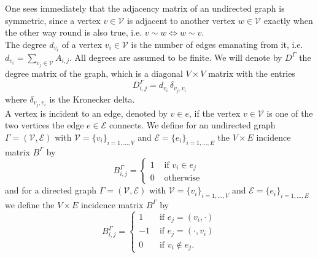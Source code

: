 One sees immediately that the adjacency matrix of an undirected graph is symmetric, since a vertex $v \in \mathcal{V}$ is adjacent to another vertex $w \in \mathcal{V}$ exactly when the other way round is also true, i.e. $v \sim w \Leftrightarrow w \sim v$. \\
The degree $d_{v_i}$ of a vertex $v_i \in \mathcal{V}$ is the number of edges emanating from it, i.e. $d_{v_i} = \sum_{v_j \in \mathcal{V}} A_{i, j}$. All degrees are assumed to be finite. We will denote by $D^{\Gamma}$ the degree matrix of the graph, which is a diagonal $V \times V$ matrix with the entries
\begin{equation}
    \label{degree matrix}
    D^{\Gamma}_{i, j} = d_{v_i} \, \delta_{v_j, v_i}
\end{equation}
where $\delta_{v_j, v_i}$ is the Kronecker delta. \\
A vertex is incident to an edge, denoted by $v \in e$, if the vertex $v \in \mathcal{V}$ is one of the two vertices the edge $e \in \mathcal{E}$ connects. We define for an undirected graph $\Gamma = (\mathcal{V}, \mathcal{E})$ with $\mathcal{V} = \{v_i\}_{i = 1, \ldots, V}$ and $\mathcal{E} = \{e_i\}_{i = 1, \ldots, E}$ the $V \times E$ incidence matrix $B^{\Gamma}$ by  
\begin{equation}
    \label{incidence matrix undirected}
    B^{\Gamma}_{i, j}= \begin{cases} 1 & \text { if } v_i \in e_j \\ 0 & \text { otherwise } \end{cases}
\end{equation}
and for a directed graph $\Gamma = (\mathcal{V}, \mathcal{E})$ with $\mathcal{V} = \{v_i\}_{i = 1, \ldots, V}$ and $\mathcal{E} = \{e_i\}_{i = 1, \ldots, E}$ we define the $V \times E$ incidence matrix $B^{\Gamma}$ by 
\begin{equation}
    \label{incidence matrix directed}
    B^{\Gamma}_{i, j}= \begin{cases} 1 & \text { if } e_j = (v_i, \cdot) \\ -1 & \text { if } e_j = (\cdot, v_i) \\ 0 & \text { if } v_i \notin e_j. \end{cases}
\end{equation}


